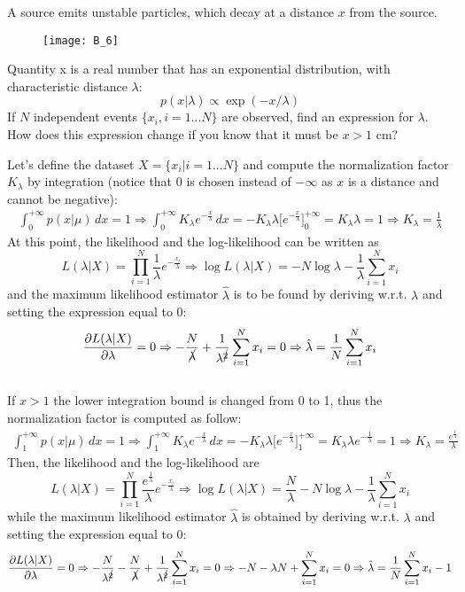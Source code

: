 \Exercise[number=6]
A source emits unstable particles, which decay at a distance \(x\) from
the source.
\begin{figure}[H]
    \texttt{[image: B\_6]}
    \centering
\end{figure}
Quantity x is a real number that has an exponential distribution, with
characteristic distance \(\lambda\):
\[
    p(x|\lambda) \propto \exp{(-x/\lambda)}
\]
If \(N\) independent events \(\{ x_i, i = 1...N\}\) are observed, find an
expression for \(\lambda\). 
How does this expression change if you know that it must be
\(x > 1\) cm?

\Answer[number=6]
Let's define the dataset \(X=\{x_i|i=1...N\}\) and compute the normalization
factor \(K_{\lambda}\) by integration (notice that 0 is chosen instead
of \(-\infty\) as \(x\) is a distance and cannot be negative):
\begin{align*}
    \int_{0}^{+\infty}p(x|\mu)\,dx = 1 \Rightarrow
    \int_{0}^{+\infty}K_{\lambda}e^{-\frac{x}{\lambda}}\,dx
    =
    -K_{\lambda}\lambda\biggl[e^{-\frac{x}{\lambda}}\biggr]_{0}^{+\infty}
    =
    K_{\lambda}\lambda
    =
    1
    \Rightarrow
    K_{\lambda}
    =
    \frac{1}{\lambda}
\end{align*}
At this point, the likelihood and the log-likelihood can be written as
\[
    L(\lambda|X)=\prod_{i=1}^{N} \frac{1}{\lambda}e^{-\frac{x_i}{\lambda}}
    \Rightarrow
    \log{L(\lambda|X)}=-N\log{\lambda}-\frac{1}{\lambda}\sum_{i=1}^{N}x_i
\]
and the maximum likelihood estimator \(\hat{\lambda}\) is to be found by
deriving w.r.t. \(\lambda\) and setting the expression equal to 0:
\begin{align*}
    \frac{\partial{L(\lambda|X)}}{\partial{\lambda}}=0
    \Rightarrow
    -\frac{N}{\cancel{\lambda}}+\frac{1}{\lambda^{\cancel{2}}}\sum_{i=1}^{N}x_i=0
    \Rightarrow
    \hat{\lambda}=\frac{1}{N}\sum_{i=1}^{N}x_i
\end{align*}
\\
If \(x>1\) the lower integration bound is changed from 0 to 1, thus the
normalization factor is computed as follow:
\begin{align*}
    \int_{1}^{+\infty}p(x|\mu)\,dx = 1 \Rightarrow
    \int_{1}^{+\infty}K_{\lambda}e^{-\frac{x}{\lambda}}\,dx
    =
    -K_{\lambda}\lambda\biggl[e^{-\frac{x}{\lambda}}\biggr]_{1}^{+\infty}
    =
    K_{\lambda}\lambda e^{-\frac{1}{\lambda}}
    =
    1
    \Rightarrow
    K_{\lambda}
    =
    \frac{e^{\frac{1}{\lambda}}}{\lambda}
\end{align*}
Then, the likelihood and the log-likelihood are
\[
    L(\lambda|X)=\prod_{i=1}^{N} \frac{e^{\frac{1}{\lambda}}}{\lambda}e^{-\frac{x_i}{\lambda}}
    \Rightarrow
    \log{L(\lambda|X)}=\frac{N}{\lambda}-N\log{\lambda}-\frac{1}{\lambda}\sum_{i=1}^{N}x_i
\]
while the maximum likelihood estimator \(\hat{\lambda}\) is obtained by
deriving w.r.t. \(\lambda\) and setting the expression equal to 0:
\begin{align*}
    \frac{\partial{L(\lambda|X)}}{\partial{\lambda}}=0
    \Rightarrow
    -\frac{N}{\lambda^{\cancel{2}}}-\frac{N}{\cancel{\lambda}}+\frac{1}{\lambda^{\cancel{2}}}\sum_{i=1}^{N}x_i=0
    \Rightarrow
    -N-\lambda N+\sum_{i=1}^{N}x_i=0
    \Rightarrow
    \hat{\lambda}=\frac{1}{N}\sum_{i=1}^{N}x_i-1
\end{align*}